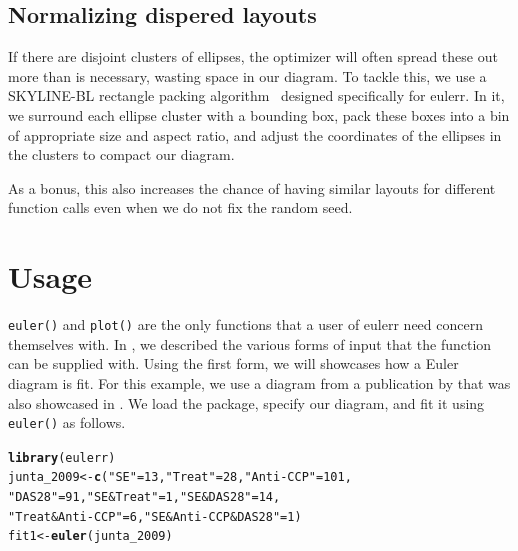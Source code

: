 \documentclass[
  oneside,
  openany,
  numbers=noendperiod,
  parskip=half,
  bibliography=totoc
]{scrbook}\usepackage[]{graphicx}\usepackage{xcolor}
\makeatletter
\newcommand{\hlnum}[1]{\textcolor[rgb]{0.686,0.059,0.569}{#1}}%
\newcommand{\hlstr}[1]{\textcolor[rgb]{0.192,0.494,0.8}{#1}}%
\newcommand{\hlstd}[1]{\textcolor[rgb]{0.345,0.345,0.345}{#1}}%
\newcommand{\hlkwb}[1]{\textcolor[rgb]{0.69,0.353,0.396}{#1}}%
\newcommand{\hlkwd}[1]{\textcolor[rgb]{0.737,0.353,0.396}{\textbf{#1}}}%
\newenvironment{kframe}{%
 \def\at@end@of@kframe{}%
 \ifinner\ifhmode%
  \def\at@end@of@kframe{\end{minipage}}%
  \begin{minipage}{\columnwidth}%
 \fi\fi%
 \def\FrameCommand##1{\hskip\@totalleftmargin \hskip-\fboxsep
 \colorbox{shadecolor}{##1}\hskip-\fboxsep
     \hskip-\linewidth \hskip-\@totalleftmargin \hskip\columnwidth}%
 \MakeFramed {\advance\hsize-\width
   \@totalleftmargin\z@ \linewidth\hsize
   \@setminipage}}%
 {\par\unskip\endMakeFramed%
 \at@end@of@kframe}
\newenvironment{knitrout}{}{} %
\newcommand{\pkg}[1]{{\fontseries{b}\selectfont #1}}
\newcommand{\code}[1]{\texttt{#1}}
\makeatother
\begin{document}
\section{Normalizing dispered layouts}
\label{sec:layout}

If there are disjoint clusters of ellipses, the optimizer will often
spread these out more than is necessary, wasting space in our diagram. To
tackle this, we
use a SKYLINE-BL rectangle packing algorithm~\citep{Jylaenki_2010}
designed specifically for \pkg{eulerr}. In it, we surround each ellipse cluster
with a bounding box, pack these boxes into a bin of appropriate size and
aspect ratio, and adjust the coordinates of the ellipses in the clusters to
compact our diagram.

As a bonus, this also increases the chance of having
similar layouts for different function calls even when we do not
fix the random seed.

\chapter{Usage}\label{ch:usage}

\code{euler()} and \code{plot()} are the only functions that a user of
\pkg{eulerr} need concern themselves with. In , we described
the various forms of input that the function can be supplied with. Using the
first form, we will showcases how a Euler diagram is fit. For this example,
we use a diagram from a publication by \citet{Junta_2009} that was also
showcased in \citet{Wilkinson_2012}. We load the package,
specify our diagram, and fit it using \code{euler()} as follows.

\begin{knitrout}\small
{}\color{fgcolor}\begin{kframe}
\begin{alltt}
\hlkwd{library}\hlstd{(eulerr)}
\hlstd{junta_2009} \hlkwb{<-} \hlkwd{c}\hlstd{(}\hlstr{"SE"} \hlstd{=} \hlnum{13}\hlstd{,} \hlstr{"Treat"} \hlstd{=} \hlnum{28}\hlstd{,} \hlstr{"Anti-CCP"} \hlstd{=} \hlnum{101}\hlstd{,}
                \hlstr{"DAS28"} \hlstd{=} \hlnum{91}\hlstd{,} \hlstr{"SE&Treat"} \hlstd{=} \hlnum{1}\hlstd{,} \hlstr{"SE&DAS28"} \hlstd{=} \hlnum{14}\hlstd{,}
                \hlstr{"Treat&Anti-CCP"} \hlstd{=} \hlnum{6}\hlstd{,} \hlstr{"SE&Anti-CCP&DAS28"} \hlstd{=} \hlnum{1}\hlstd{)}
\hlstd{fit1} \hlkwb{<-} \hlkwd{euler}\hlstd{(junta_2009)}
\end{alltt}
\end{kframe}
\end{knitrout}
\end{document}

